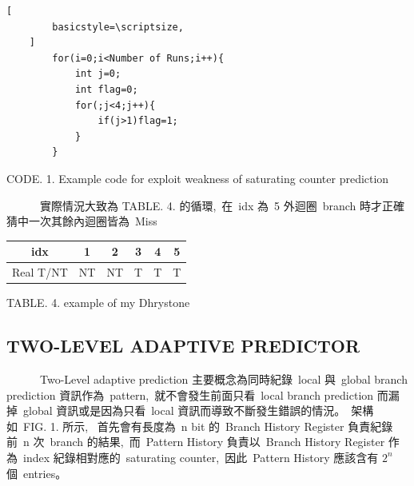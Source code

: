 \documentclass{article}
\begin{document}
\begin{CJK*}{UTF8}{bsmi}
\begin{multicols}{2}
\begin{flushleft}
    \begin{lstlisting}[
        basicstyle=\scriptsize, 
    ]
        for(i=0;i<Number of Runs;i++){
            int j=0;
            int flag=0;
            for(;j<4;j++){
                if(j>1)flag=1;
            }
        }
    \end{lstlisting}
    \begin{center}
        \footnotesize CODE. 1. Example code for exploit weakness of saturating counter prediction
    \end{center}    
\end{flushleft}

\begin{flushleft}
    \ \ \ \ \ \ 實際情況大致為 TABLE. 4. 的循環,\
    在\ idx 為\ 5 外迴圈\ branch 時才正確猜中一次其餘內迴圈皆為\ Miss
\end{flushleft}

\begin{center}
    \begin{tabular}{||c c c c c c ||} 
        \hline
        idx & 1 & 2 & 3 & 4 & 5 \\ [1.0ex] 
        \hline\hline
        Real T/NT &  NT & NT & T & T & T  \\ 
        \hline
    \end{tabular}
\end{center}

\begin{center}
    \footnotesize TABLE. 4. example of my Dhrystone
\end{center}

\begin{center}
    \section*{TWO-LEVEL ADAPTIVE PREDICTOR}
\end{center}

\begin{flushleft}
    \ \ \ \ \ \ Two-Level adaptive prediction 主要概念為同時紀錄\ local 與\ global branch prediction 資訊作為\ pattern,\
    就不會發生前面只看\ local branch prediction 而漏掉\ global 資訊或是因為只看\ local 資訊而導致不斷發生錯誤的情況。\
    架構如\ FIG. 1. 所示, \
    首先會有長度為\ n bit 的\ Branch History Register 負責紀錄前\ n 次\ branch 的結果,\
    而\ Pattern History 負責以\ Branch History Register 作為\ index 紀錄相對應的\ saturating counter,\
    因此\ Pattern History 應該含有 ${2^{n}}$ 個\ entries。\newline
\end{flushleft}


\end{multicols}
\end{CJK*}
\end{document}
